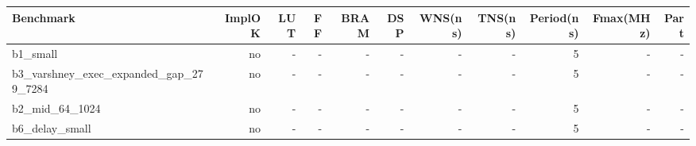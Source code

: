 \begin{tabular}{lrrrrrrrrrr}
\hline
Benchmark & ImplOK & LUT & FF & BRAM & DSP & WNS(ns) & TNS(ns) & Period(ns) & Fmax(MHz) & Part \\
\hline
b1\_small & no & - & - & - & - & - & - & 5 & - & - \\
b3\_varshney\_exec\_expanded\_gap\_279\_7284 & no & - & - & - & - & - & - & 5 & - & - \\
b2\_mid\_64\_1024 & no & - & - & - & - & - & - & 5 & - & - \\
b6\_delay\_small & no & - & - & - & - & - & - & 5 & - & - \\
\hline
\end{tabular}
